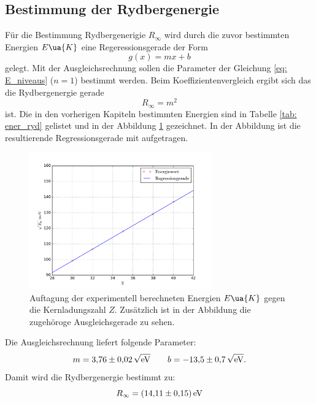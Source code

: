 \subsection{Bestimmung der Rydbergenergie}
Für die Bestimmung Rydbergenerigie $R_\infty$ wird durch die zuvor
bestimmten Energien $E\ua{K}$ eine Regeressionsgerade der Form
\begin{equation*}
  g(x)=mx+b
\end{equation*}
gelegt. Mit der Ausgleichsrechnung sollen die Parameter der Gleichung \eqref{eq: E_niveaus} ($n=1$)
bestimmt werden. Beim Koeffizientenvergleich ergibt sich das die Rydbergenergie
gerade
\begin{equation*}
  R_\infty=m^2
\end{equation*}
ist.
Die in den vorherigen Kapiteln bestimmten Energien sind in Tabelle \ref{tab: ener_ryd} gelistet
und in der Abbildung \ref{fig: ryd_ener} gezeichnet. In der Abbildung ist
die resultierende Regressionsgerade mit aufgetragen.

\begin{figure}
  \centering
  \includegraphics[width=0.7\textwidth]{../Messdaten/energie_z.pdf}
  \caption{Auftagung der experimentell berechneten Energien $E\ua{K}$ gegen die Kernladungszahl $Z$. Zusätzlich ist in der Abbildung die zugehöroge Ausgleichsgerade zu sehen. } %
  \label{fig: ryd_ener}
\end{figure}
Die Ausgleichsrechnung liefert folgende Parameter:
\begin{equation*}
m=\num{3.76\pm0.02}\,\sqrt{\si{\eV}} \qquad b=\num{-13.5\pm0.7}\,\sqrt{\si{\eV}}.
\end{equation*}
Damit wird die Rydbergenergie bestimmt zu:
\begin{equation}
  R_\infty=\SI{14.11\pm0.15}{\eV}
\end{equation}
\FloatBarrier
